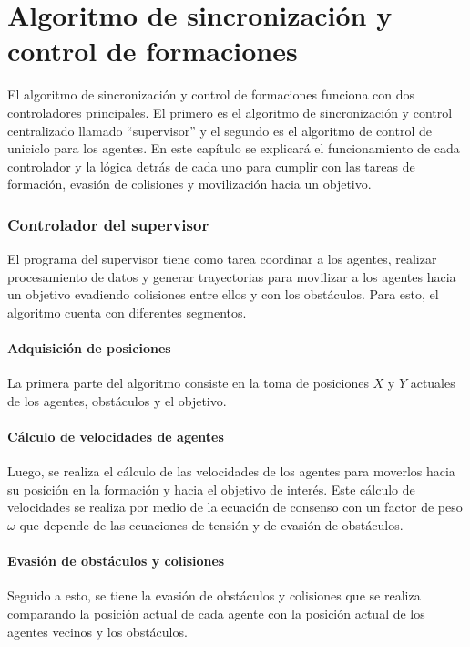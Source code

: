 \chapter{Algoritmo de sincronización y control de formaciones}
El algoritmo de sincronización y control de formaciones funciona con dos controladores principales. El primero es el algoritmo de sincronización y control centralizado llamado ``supervisor'' y el segundo es el algoritmo de control de uniciclo para los agentes. En este capítulo se explicará el funcionamiento de cada controlador y la lógica detrás de cada uno para cumplir con las tareas de formación, evasión de colisiones y movilización hacia un objetivo.

\subsection{Controlador del supervisor}
El programa del supervisor tiene como tarea coordinar a los agentes, realizar procesamiento de datos y generar trayectorias para movilizar a los agentes hacia un objetivo evadiendo colisiones entre ellos y con los obstáculos. Para esto, el algoritmo cuenta con diferentes segmentos.

\subsubsection{Adquisición de posiciones}
La primera parte del algoritmo consiste en la toma de posiciones $X$ y $Y$ actuales de los agentes, obstáculos y el objetivo. 

\subsubsection{Cálculo de velocidades de agentes}
Luego, se realiza el cálculo de las velocidades de los agentes para moverlos hacia su posición en la formación y hacia el objetivo de interés. Este cálculo de velocidades se realiza por medio de la ecuación de consenso con un factor de peso $\omega$ que depende de las ecuaciones de tensión y de evasión de obstáculos. 

\subsubsection{Evasión de obstáculos y colisiones}
Seguido a esto, se tiene la evasión de obstáculos y colisiones que se realiza comparando la posición actual de cada agente con la posición actual de los agentes vecinos y los obstáculos.

